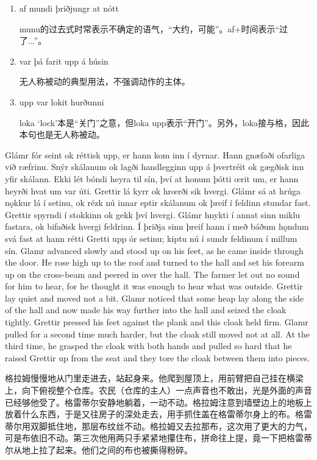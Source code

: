 \begin{grammar*}{}
  \begin{enumerate}[leftmargin=*]
    \item af mundi þriðjungr at nótt

          munu的过去式时常表示不确定的语气，“大约，可能”。af+时间表示“过了...”。

    \item var þá farit upp á húsin

          无人称被动的典型用法，不强调动作的主体。

    \item upp var lokit hurðunni

          loka `lock'本是“关门”之意，但loka upp表示“开门”。另外，loka接与格，因此本句也是无人称被动。
  \end{enumerate}
\end{grammar*}
\begin{paracol}{2}
  Glámr fór seint ok réttisk upp, er hann kom inn í dyrnar. Hann gnæfaði ofarliga við ræfrinu. Snýr skálanum ok lagði handlegginn upp á þvertréit ok gægðisk inn yfir skálann. Ekki lét bóndi heyra til sín, því at honum þótti œrit um, er hann heyrði hvat um var úti. Grettir lá kyrr ok hrœrði sik hvergi. Glámr sá at hrúga nǫkkur lá í setinu, ok rézk nú innar eptir skálanum ok þreif í feldinn stundar fast. Grettir spyrndi í stokkinn ok gekk því hvergi. Glámr hnykti í annat sinn miklu fastara, ok bifaðisk hvergi feldrinn. Í þriðja sinn þreif hann í með báðum hǫndum svá fast at hann rétti Gretti upp ór setinu; kiptu nú í sundr feldinum í millum sín.
  \switchcolumn
  Glamr advanced slowly and stood up on his feet, as he came inside through the door. He rose high up to the roof and turned to the hall and set his forearm up on the cross-beam and peered in over the hall. The farmer let out no sound for him to hear, for he thought it was enough to hear what was outside. Grettir lay quiet and moved not a bit. Glamr noticed that some heap lay along the side of the hall and now made his way further into the hall and seized the cloak tightly. Grettir pressed his feet against the plank and this cloak held firm. Glamr pulled for a second time much harder, but the cloak still moved not at all. At the third time, he grasped the cloak with both hands and pulled so hard that he raised Grettir up from the seat and they tore the cloak between them into pieces.
\end{paracol}
\begin{translation*}{}
  格拉姆慢慢地从门里走进去，站起身来。他爬到屋顶上，用前臂把自己挂在横梁上，向下俯视整个仓库。农民（仓库的主人）一点声音也不敢出，光是外面的声音已经够他受了。格雷蒂尔安静地躺着，一动不动。格拉姆注意到墙壁边上的地板上放着什么东西，于是又往房子的深处走去，用手抓住盖在格雷蒂尔身上的布。格雷蒂尔用双脚抵住地，那层布纹丝不动。格拉姆又去拉那布，这次用了更大的力气，可是布依旧不动。第三次他用两只手紧紧地攥住布，拼命往上提，竟一下把格雷蒂尔从地上拉了起来。他们之间的布也被撕得粉碎。
\end{translation*}
